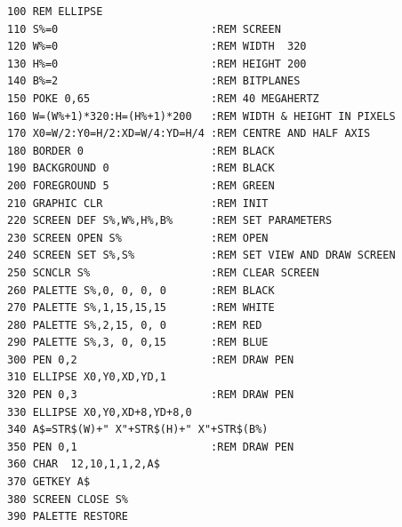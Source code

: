 \begin{description}[leftmargin=2cm,style=nextline]
\newpage
\begin{tcolorbox}[colback=black,coltext=white]
\verbatimfont{\codefont}
\begin{verbatim}
100 REM ELLIPSE
110 S%=0                        :REM SCREEN
120 W%=0                        :REM WIDTH  320
130 H%=0                        :REM HEIGHT 200
140 B%=2                        :REM BITPLANES
150 POKE 0,65                   :REM 40 MEGAHERTZ
160 W=(W%+1)*320:H=(H%+1)*200   :REM WIDTH & HEIGHT IN PIXELS
170 X0=W/2:Y0=H/2:XD=W/4:YD=H/4 :REM CENTRE AND HALF AXIS
180 BORDER 0                    :REM BLACK
190 BACKGROUND 0                :REM BLACK
200 FOREGROUND 5                :REM GREEN
210 GRAPHIC CLR                 :REM INIT
220 SCREEN DEF S%,W%,H%,B%      :REM SET PARAMETERS
230 SCREEN OPEN S%              :REM OPEN
240 SCREEN SET S%,S%            :REM SET VIEW AND DRAW SCREEN
250 SCNCLR S%                   :REM CLEAR SCREEN
260 PALETTE S%,0, 0, 0, 0       :REM BLACK
270 PALETTE S%,1,15,15,15       :REM WHITE
280 PALETTE S%,2,15, 0, 0       :REM RED
290 PALETTE S%,3, 0, 0,15       :REM BLUE
300 PEN 0,2                     :REM DRAW PEN
310 ELLIPSE X0,Y0,XD,YD,1
320 PEN 0,3                     :REM DRAW PEN
330 ELLIPSE X0,Y0,XD+8,YD+8,0
340 A$=STR$(W)+" X"+STR$(H)+" X"+STR$(B%)
350 PEN 0,1                     :REM DRAW PEN
360 CHAR  12,10,1,1,2,A$
370 GETKEY A$
380 SCREEN CLOSE S%
390 PALETTE RESTORE
\end{verbatim}
\end{tcolorbox}
\end{description}

\newpage
